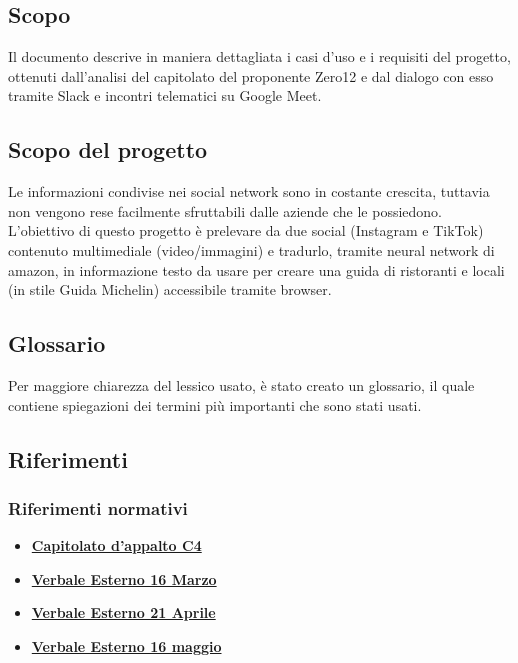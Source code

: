 \subsection{Scopo}
Il documento descrive in maniera dettagliata i casi d’uso e i requisiti del progetto, 
ottenuti dall’analisi del capitolato del proponente Zero12 e dal dialogo con esso tramite Slack e incontri telematici su Google Meet.

\subsection{Scopo del progetto}
Le informazioni condivise nei social network sono in costante crescita, tuttavia 
non vengono rese facilmente sfruttabili dalle aziende che le possiedono. 
L'obiettivo di questo progetto è prelevare da due social (Instagram e TikTok) 
contenuto multimediale (video/immagini) e tradurlo, tramite neural network di 
amazon, in informazione testo da usare per creare una guida di ristoranti e locali
(in stile Guida Michelin) accessibile tramite browser. 

\subsection{Glossario}
Per maggiore chiarezza del lessico usato, è stato creato un glossario, il quale 
contiene spiegazioni dei termini più importanti che sono stati usati.

\subsection{Riferimenti}
\subsubsection{Riferimenti normativi}
\begin{itemize}
	\item
	\href{https://www.google.com/}{\textbf{Capitolato d’appalto C4}}
    \item
    \href{https://www.google.com/}{\textbf{Verbale Esterno 16 Marzo}}
    \item
	\href{https://www.google.com/}{\textbf{Verbale Esterno 21 Aprile}}
    \item
	\href{https://www.google.com/}{\textbf{Verbale Esterno 16 maggio}}

\end{itemize}
